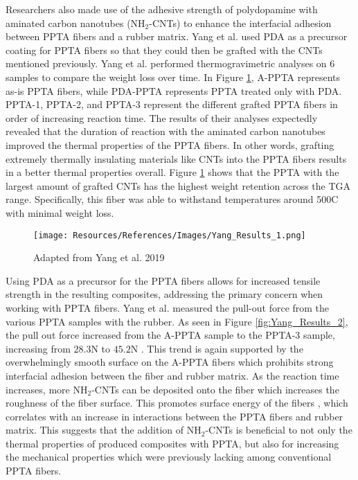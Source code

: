 \documentclass[12pt]{article}
\begin{document}
\begin{multicols}{2}
\indent Researchers also made use of the adhesive strength of polydopamine with aminated carbon nanotubes (NH$_2$-CNTs) to enhance the interfacial adhesion between PPTA fibers and a rubber matrix. Yang et al. \citep{Yang2019} used PDA as a precursor coating for PPTA fibers so that they could then be grafted with the CNTs mentioned previously.  Yang et al. \citep{Yang2019} performed thermogravimetric analyses on 6 samples to compare the weight loss over time. In Figure \ref{fig:Yang_Results_1}, A-PPTA represents as-is PPTA fibers, while PDA-PPTA represents PPTA treated only with PDA. PPTA-1, PPTA-2, and PPTA-3 represent the different grafted PPTA fibers in order of increasing reaction time. The results of their analyses expectedly revealed that the duration of reaction with the aminated carbon nanotubes improved the thermal properties of the PPTA fibers. In other words, grafting extremely thermally insulating materials like CNTs into the PPTA fibers results in a better thermal properties overall. Figure \ref{fig:Yang_Results_1} shows that the PPTA with the largest amount of grafted CNTs has the highest weight retention across the TGA range. Specifically, this fiber was able to withstand temperatures around 500\degree C with minimal weight loss. 

\begin{figure}[H]
    \centering
    \texttt{[image: Resources/References/Images/Yang\_Results\_1.png]}
    \caption{\scriptsize{Adapted from Yang et al. 2019 \citep{Yang2019}}}
    \label{fig:Yang_Results_1}
\end{figure}

\indent Using PDA as a precursor for the PPTA fibers allows for increased tensile strength in the resulting composites, addressing the primary concern when working with PPTA fibers. Yang et al. \citep{Yang2019} measured the pull-out force from the various PPTA samples with the rubber. As seen in Figure \ref{fig:Yang_Results_2}, the pull out force increased from the A-PPTA sample to the PPTA-3 sample, increasing from $28.3$N to $45.2$N \citep{Yang2019}. This trend is again supported by the overwhelmingly smooth surface on the A-PPTA fibers which prohibits strong interfacial adhesion between the fiber and rubber matrix. As the reaction time increases, more NH$_2$-CNTs can be deposited onto the fiber which increases the roughness of the fiber surface. This promotes surface energy of the fibers \citep{Yang2019}, which correlates with an increase in interactions between the PPTA fibers and rubber matrix. This suggests that the addition of NH$_2$-CNTs is beneficial to not only the thermal properties of produced composites with PPTA, but also for increasing the mechanical properties which were previously lacking among conventional PPTA fibers.


\end{multicols}
\end{document}
